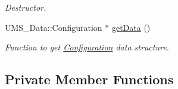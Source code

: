 \begin{DoxyCompactItemize}
\begin{DoxyCompactList}\small\item\em Destructor. \item\end{DoxyCompactList}\item 
UMS\_\-Data::Configuration $\ast$ \hyperlink{classConfigurationServer_ae1ce593072e5a6828128c5c80758604c}{getData} ()
\begin{DoxyCompactList}\small\item\em Function to get \hyperlink{classConfiguration}{Configuration} data structure. \item\end{DoxyCompactList}\end{DoxyCompactItemize}
\subsection*{Private Member Functions}
